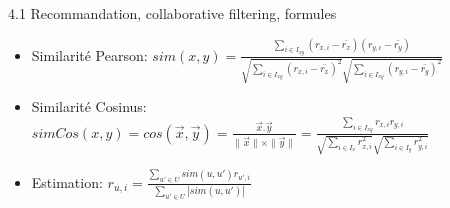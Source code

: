 \begin{frame}{4.1 Recommandation, collaborative filtering, formules}
  \begin{itemize}
  \item \textcolor{orangeAgaetis}{Similarité Pearson:} $sim(x, y) = \frac{\displaystyle\sum_{i \in I_{xy}}(r_{x,i} - \bar{r_{x}})(r_{y,i} - \bar{r_{y}})}{\sqrt{\displaystyle\sum_{i \in I_{xy}}(r_{x,i} - \bar{r_{x}})^{2}}\sqrt{\displaystyle\sum_{i \in I_{xy}}(r_{y,i} - \bar{r_{y}})^{2}}}$
  \item \textcolor{orangeAgaetis}{Similarité Cosinus:} $simCos(x,y) = cos(\vec{x}, \vec{y}) = \frac{\vec{x} . \vec{y}}{\|\vec{x}\| \times \|\vec{y}\|} = \frac{\displaystyle\sum_{i \in I_{xy}} r_{x,i}r_{y,i}}{\sqrt{\displaystyle\sum_{i \in I_{x}}r_{x,i}^{2}}\sqrt{\displaystyle\sum_{i \in I_{y}}r_{y,i}^{2}}}$
  \item \textcolor{orangeAgaetis}{Estimation:} $r_{u,i} = \frac{\displaystyle\sum_{u' \in U} sim(u, u')r_{u',i}}{\displaystyle\sum_{u' \in U} |sim(u,u')|}$
  \end{itemize}
\end{frame}

